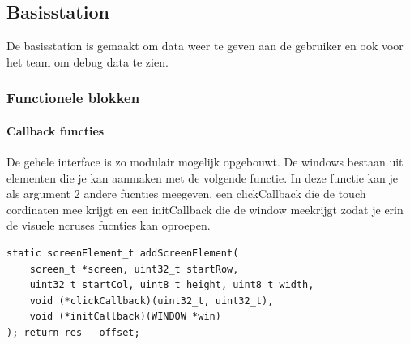 \subsection{Basisstation} \label{sec:basestation}
De basisstation is gemaakt om data weer te geven aan de gebruiker en ook voor het team om debug data te zien. 
\subsubsection{Functionele blokken}

\paragraph{Callback functies}
De gehele interface is zo modulair mogelijk opgebouwt. De windows bestaan uit elementen die je kan aanmaken met de volgende functie.
In deze functie kan je als argument 2 andere fucnties meegeven, een clickCallback die de touch cordinaten mee krijgt en een initCallback die de window meekrijgt zodat je erin de visuele ncruses fucnties kan oproepen. 
\begin{lstlisting}[caption={ScreenElement},captionpos=b,label={lst:ScreenELement},style=c]
static screenElement_t addScreenElement(
    screen_t *screen, uint32_t startRow,
    uint32_t startCol, uint8_t height, uint8_t width,
    void (*clickCallback)(uint32_t, uint32_t),
    void (*initCallback)(WINDOW *win)
); return res - offset;
\end{lstlisting}



